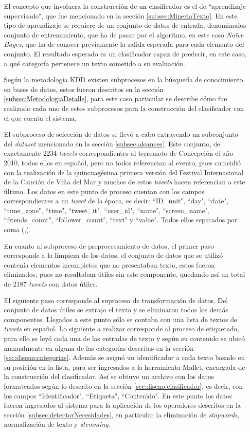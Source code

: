 El concepto que involucra la construcción de un clasificador es el de ``aprendizaje supervisado", que fue mencionado en la sección \ref{subsec:MineriaTexto}. En este tipo de aprendizaje se requiere de un conjunto de datos de entrada, denominados conjunto de entrenamiento, que ha de pasar por el algoritmo, en este caso \textit{Naïve Bayes}, que ha de conocer previamente la salida esperada para cada elemento del conjunto. El resultado esperado es un clasificador capaz de predecir, en este caso, a qué categoría pertenece un texto sometido a su evaluación.

Según la metodología KDD existen subprocesos en la búsqueda de conocimiento en bases de datos, estos fueron descritos en la sección \ref{subsec:MetodologiaDetalle}, para este caso particular se describe cómo fue realizado cada uno de estos subprocesos para la construcción del clasificador con el que cuenta el sistema.

El subproceso de selección de datos se llevó a cabo extrayendo un subconjunto del \textit{dataset} mencionado en la sección \ref{subsec:alcances}. Este conjunto, de exactamente 2234 \textit{tweets} correspondientes al terremoto de Concepción el año 2010, todos ellos en español, pero no todos referencian al evento, pues coincidió con la realización de la quincuagésima primera versión del Festival Internacional de la Canción de Viña del Mar y muchos de estos \textit{tweets} hacen referencian a este último. Los datos en este punto de proceso cuentan con los campos correspondientes a un \textit{tweet} de la época, es decir: ``ID\_unit", ``day", ``date", ``time\_zone", ``time", ``tweet\_it", ``user\_id", ``name", ``screen\_name", ``friends\_count", ``follower\_count", ``text" y ``value". Todos ellos separados por coma (,).

En cuanto al subproceso de preprocesamiento de datos, el primer paso corresponde a la limpieza de los datos, el conjunto de datos que se utilizó contenía elementos incompletos que no presentaban texto, estos fueron eliminados, pues no resultaban útiles sin este componente, quedando así un total de 2187 \textit{tweets} con datos útiles.

El siguiente paso corresponde al suproceso de transformación de datos. Del conjunto de datos útiles se extrajo el texto y se eliminaron todos los demás componentes. Llegados a este punto sólo se contaba con una lista de textos de \textit{tweets} en español. Lo siguiente a realizar corresponde al proceso de etiquetado, para ello se leyó cada una de las entradas de texto y según su contenido se ubicó manualmente en alguna de las categorías descritas en la sección \ref{sec:diseno:categorias}. Además se asignó un identificador a cada texto basado en su posición en la lista, para ser ingresados a la herramienta Mallet, encargada de la construcción del clasificador. Así se obtuvo un archivo con los datos formateados según lo descrito en la sección \ref{sec:diseno:clasificador}, es decir, con los campos ``Identificador", ``Etiqueta", ``Contenido". En este punto los datos fueron ingresados al sistema para la aplicación de los operadores descritos en la sección \ref{subsec:detectorNecesidades}, en particular la eliminación de \textit{stopwords}, normalización de texto y \textit{stemming}.

